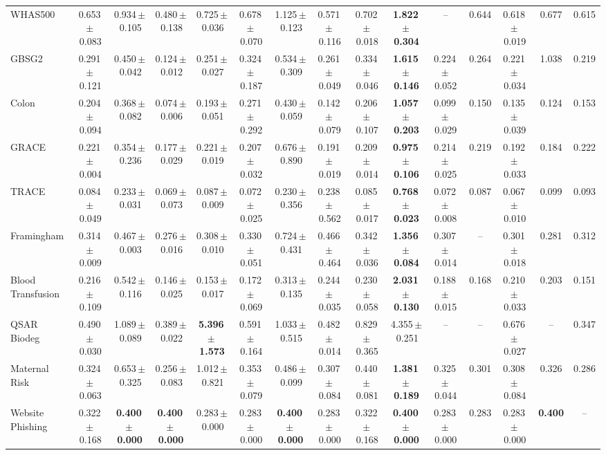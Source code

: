 \documentclass[8pt]{extarticle}
\begin{document}
\begin{longtable}{l*{14}{c}}
WHAS500 & 0.653\,$\pm$\,0.083 & 0.934\,$\pm$\,0.105 & 0.480\,$\pm$\,0.138 & 0.725\,$\pm$\,0.036 & 0.678\,$\pm$\,0.070 & 1.125\,$\pm$\,0.123 & 0.571\,$\pm$\,0.116 & 0.702\,$\pm$\,0.018 & \textbf{1.822\,$\pm$\,0.304} & -- & 0.644 & 0.618\,$\pm$\,0.019 & 0.677 & 0.615 \\
GBSG2 & 0.291\,$\pm$\,0.121 & 0.450\,$\pm$\,0.042 & 0.124\,$\pm$\,0.012 & 0.251\,$\pm$\,0.027 & 0.324\,$\pm$\,0.187 & 0.534\,$\pm$\,0.309 & 0.261\,$\pm$\,0.049 & 0.334\,$\pm$\,0.046 & \textbf{1.615\,$\pm$\,0.146} & 0.224\,$\pm$\,0.052 & 0.264 & 0.221\,$\pm$\,0.034 & 1.038 & 0.219 \\
Colon & 0.204\,$\pm$\,0.094 & 0.368\,$\pm$\,0.082 & 0.074\,$\pm$\,0.006 & 0.193\,$\pm$\,0.051 & 0.271\,$\pm$\,0.292 & 0.430\,$\pm$\,0.059 & 0.142\,$\pm$\,0.079 & 0.206\,$\pm$\,0.107 & \textbf{1.057\,$\pm$\,0.203} & 0.099\,$\pm$\,0.029 & 0.150 & 0.135\,$\pm$\,0.039 & 0.124 & 0.153 \\
GRACE & 0.221\,$\pm$\,0.004 & 0.354\,$\pm$\,0.236 & 0.177\,$\pm$\,0.029 & 0.221\,$\pm$\,0.019 & 0.207\,$\pm$\,0.032 & 0.676\,$\pm$\,0.890 & 0.191\,$\pm$\,0.019 & 0.209\,$\pm$\,0.014 & \textbf{0.975\,$\pm$\,0.106} & 0.214\,$\pm$\,0.025 & 0.219 & 0.192\,$\pm$\,0.033 & 0.184 & 0.222 \\
TRACE & 0.084\,$\pm$\,0.049 & 0.233\,$\pm$\,0.031 & 0.069\,$\pm$\,0.073 & 0.087\,$\pm$\,0.009 & 0.072\,$\pm$\,0.025 & 0.230\,$\pm$\,0.356 & 0.238\,$\pm$\,0.562 & 0.085\,$\pm$\,0.017 & \textbf{0.768\,$\pm$\,0.023} & 0.072\,$\pm$\,0.008 & 0.087 & 0.067\,$\pm$\,0.010 & 0.099 & 0.093 \\
Framingham & 0.314\,$\pm$\,0.009 & 0.467\,$\pm$\,0.003 & 0.276\,$\pm$\,0.016 & 0.308\,$\pm$\,0.010 & 0.330\,$\pm$\,0.051 & 0.724\,$\pm$\,0.431 & 0.466\,$\pm$\,0.464 & 0.342\,$\pm$\,0.036 & \textbf{1.356\,$\pm$\,0.084} & 0.307\,$\pm$\,0.014 & -- & 0.301\,$\pm$\,0.018 & 0.281 & 0.312 \\
Blood Transfusion & 0.216\,$\pm$\,0.109 & 0.542\,$\pm$\,0.116 & 0.146\,$\pm$\,0.025 & 0.153\,$\pm$\,0.017 & 0.172\,$\pm$\,0.069 & 0.313\,$\pm$\,0.135 & 0.244\,$\pm$\,0.035 & 0.230\,$\pm$\,0.058 & \textbf{2.031\,$\pm$\,0.130} & 0.188\,$\pm$\,0.015 & 0.168 & 0.210\,$\pm$\,0.033 & 0.203 & 0.151 \\
QSAR Biodeg & 0.490\,$\pm$\,0.030 & 1.089\,$\pm$\,0.089 & 0.389\,$\pm$\,0.022 & \textbf{5.396\,$\pm$\,1.573} & 0.591\,$\pm$\,0.164 & 1.033\,$\pm$\,0.515 & 0.482\,$\pm$\,0.014 & 0.829\,$\pm$\,0.365 & 4.355\,$\pm$\,0.251 & -- & -- & 0.676\,$\pm$\,0.027 & -- & 0.347 \\
Maternal Risk & 0.324\,$\pm$\,0.063 & 0.653\,$\pm$\,0.325 & 0.256\,$\pm$\,0.083 & 1.012\,$\pm$\,0.821 & 0.353\,$\pm$\,0.079 & 0.486\,$\pm$\,0.099 & 0.307\,$\pm$\,0.084 & 0.440\,$\pm$\,0.081 & \textbf{1.381\,$\pm$\,0.189} & 0.325\,$\pm$\,0.044 & 0.301 & 0.308\,$\pm$\,0.084 & 0.326 & 0.286 \\
Website Phishing & 0.322\,$\pm$\,0.168 & \textbf{0.400\,$\pm$\,0.000} & \textbf{0.400\,$\pm$\,0.000} & 0.283\,$\pm$\,0.000 & 0.283\,$\pm$\,0.000 & \textbf{0.400\,$\pm$\,0.000} & 0.283\,$\pm$\,0.000 & 0.322\,$\pm$\,0.168 & \textbf{0.400\,$\pm$\,0.000} & 0.283\,$\pm$\,0.000 & 0.283 & 0.283\,$\pm$\,0.000 & \textbf{0.400} & -- \\
\end{longtable}
\end{document}
